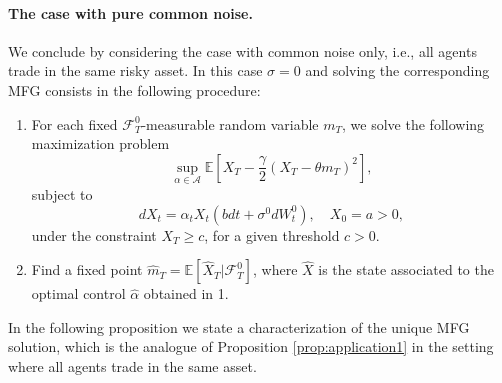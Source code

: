 \documentclass[11pt,a4paper]{article}
\begin{document}
\paragraph{The case with pure common noise.}
We conclude by considering the case with common noise only, i.e., all agents trade in the same risky asset. In this case $\sigma=0$ and solving the corresponding MFG consists in the following procedure: 
\begin{enumerate}
\item For each fixed $\mathcal F_T ^0$-measurable random variable $m_T$, we solve the following maximization problem
\[ \sup_{\alpha \in \mathcal A}\mathbb E\left[ X_T -\frac{\gamma}{2}(X_T - \theta m_T)^2  \right], \]
subject to
\begin{equation}
    \label{sde oic}
    dX_t = \alpha_t X_t (b dt + \sigma^0 dW_t^0 ), \quad X_0=a >0,  
\end{equation}
under the constraint $X_T \geq c$, for a given threshold $c >0$.

\item Find a fixed point $\hat m_T = \mathbb E[\hat X _T| \mathcal{F}_T^0]$, where $\hat X$ is the state associated to the optimal control $\hat\alpha$ obtained in 1.
\end{enumerate}

In the following proposition we state a characterization of the unique MFG solution, which is the analogue of Proposition \ref{prop:application1} in the setting where all agents trade in the same asset.
\end{document}
